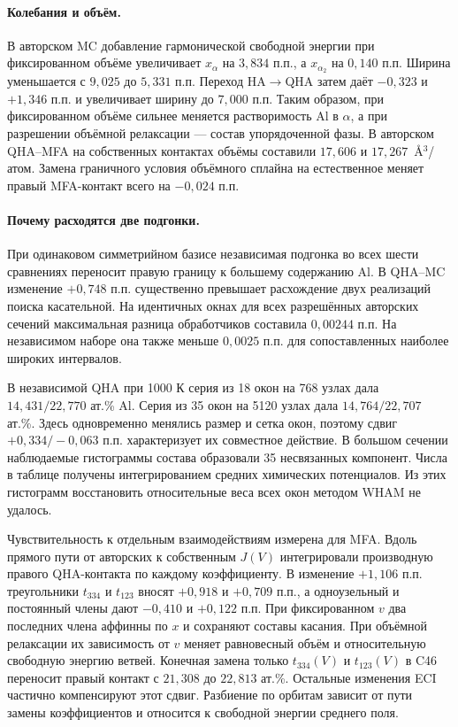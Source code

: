 \paragraph{Колебания и объём.}
В авторском MC добавление гармонической свободной энергии при фиксированном
объёме увеличивает \(x_\alpha\) на \(3{,}834\) п.п., а \(x_{\alpha_2}\)
на \(0{,}140\) п.п. Ширина уменьшается с \(9{,}025\) до \(5{,}331\) п.п.
Переход HA\(\to\)QHA затем даёт \(-0{,}323\) и \(+1{,}346\) п.п.
и увеличивает ширину до \(7{,}000\) п.п. Таким образом, при фиксированном
объёме сильнее меняется растворимость Al в \(\alpha\), а при разрешении
объёмной релаксации --- состав упорядоченной фазы. В авторском QHA--MFA
на собственных контактах объёмы составили \(17{,}606\) и
\(17{,}267\)~\AA$^3$/атом. Замена граничного условия объёмного сплайна
на естественное меняет правый MFA-контакт всего на \(-0{,}024\) п.п.

\paragraph{Почему расходятся две подгонки.}
При одинаковом симметрийном базисе независимая подгонка во всех шести
сравнениях переносит правую границу к большему содержанию Al.
В QHA--MC изменение \(+0{,}748\) п.п. существенно превышает расхождение
двух реализаций поиска касательной. На идентичных окнах для всех
разрешённых авторских сечений максимальная разница обработчиков
составила \(0{,}00244\) п.п. На независимом наборе она также
меньше \(0{,}0025\) п.п. для сопоставленных наиболее широких интервалов.

В независимой QHA при 1000 К серия из 18 окон на 768 узлах дала
\(14{,}431/22{,}770\) ат.\% Al. Серия из 35 окон на 5120 узлах
дала \(14{,}764/22{,}707\) ат.\%. Здесь одновременно менялись размер
и сетка окон, поэтому сдвиг \(+0{,}334/-0{,}063\) п.п. характеризует
их совместное действие. В большом сечении наблюдаемые гистограммы
состава образовали 35 несвязанных компонент. Числа в таблице получены
интегрированием средних химических потенциалов. Из этих гистограмм
восстановить относительные веса всех окон методом WHAM не удалось.

Чувствительность к отдельным взаимодействиям измерена для MFA.
Вдоль прямого пути от авторских к собственным \(J(V)\) интегрировали
производную правого QHA-контакта по каждому коэффициенту.
В изменение \(+1{,}106\) п.п. треугольники \(t_{334}\) и \(t_{123}\)
вносят \(+0{,}918\) и \(+0{,}709\) п.п., а одноузельный и постоянный
члены дают \(-0{,}410\) и \(+0{,}122\) п.п. При фиксированном \(v\)
два последних члена аффинны по \(x\) и сохраняют составы касания.
При объёмной релаксации их зависимость от \(v\) меняет равновесный объём
и относительную свободную энергию ветвей. Конечная замена только
\(t_{334}(V)\) и \(t_{123}(V)\) в C46 переносит правый контакт
с \(21{,}308\) до \(22{,}813\) ат.\%. Остальные изменения ECI частично
компенсируют этот сдвиг. Разбиение по орбитам зависит от пути замены
коэффициентов и относится к свободной энергии среднего поля.

